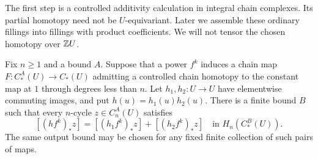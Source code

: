The first step is a controlled additivity calculation in integral
chain complexes.  Its partial homotopy need not be $U$-equivariant.
Later we assemble these ordinary fillings into fillings with product
coefficients.  We will not tensor the chosen homotopy over $\mathbb Z U$.

\begin{lemma}\label{lem:controlled-additivity}
Fix $n\ge1$ and a bound $A$.  Suppose that a power $f^k$ induces a
chain map
$F:C_*^A(U)\to C_*(U)$ admitting a controlled chain homotopy to the
constant map at $1$ through degrees less than $n$.  Let
$h_1,h_2:U\to U$ have elementwise commuting images, and put
$h(u)=h_1(u)h_2(u)$.  There is a finite bound $B$ such that every
$n$-cycle $z\in C_n^A(U)$ satisfies
\[
 [(h f^k)_*z]=[(h_1f^k)_*z]+[(h_2f^k)_*z]
       \quad\text{in }H_n(C_*^B(U)).
\]
The same output bound may be chosen for any fixed finite collection
of such pairs of maps.
\end{lemma}

